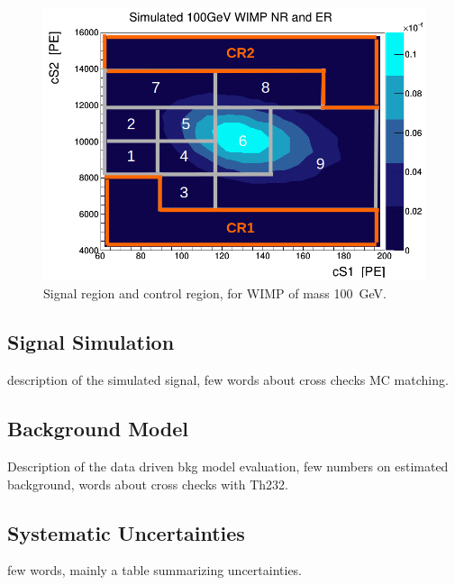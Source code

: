 \begin{figure}[h]
  \includegraphics[width=\linewidth]{images/wimp_in_sr.png}
  \caption{Signal region and control region, for WIMP of mass 100~GeV.}
  \label{fig:SR2}
\end{figure}


\subsection{Signal Simulation} 

description of the simulated signal, few words about cross checks MC matching.


\subsection {Background Model}
Description of the data driven bkg model evaluation, few numbers on estimated background, words about cross checks with Th232.

\subsection{Systematic Uncertainties}

few words, mainly a table summarizing uncertainties.

